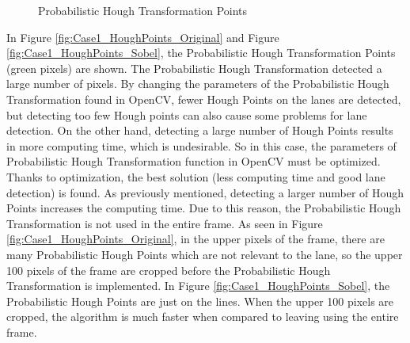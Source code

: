 \begin{figure}[H]
  \centering
  \hfill
  \caption{Probabilistic Hough Transformation Points}
\end{figure} 
 
In Figure \ref{fig:Case1_HoughPoints_Original} and Figure \ref{fig:Case1_HoughPoints_Sobel}, the Probabilistic Hough Transformation Points (green pixels) are shown. The Probabilistic Hough Transformation detected a large number of pixels. By changing the parameters of the Probabilistic Hough Transformation found in OpenCV, fewer Hough Points on the lanes are detected, but detecting too few Hough points can also cause some problems for lane detection. On the other hand, detecting a large number of Hough Points results in more computing time, which is undesirable. So in this case, the parameters of Probabilistic Hough Transformation function in OpenCV must be optimized. Thanks to optimization, the best solution (less computing time and good lane detection) is found.  As previously mentioned, detecting a larger number of Hough Points increases the computing time. Due to this reason, the Probabilistic Hough Transformation is not used in the entire frame. As seen in Figure \ref{fig:Case1_HoughPoints_Original}, in the upper pixels of the frame, there are many Probabilistic Hough Points which are not relevant to the lane, so the upper 100 pixels of the frame are cropped before the Probabilistic Hough Transformation is implemented. In Figure \ref{fig:Case1_HoughPoints_Sobel}, the Probabilistic Hough Points are just on the lines. When the upper 100 pixels are cropped, the algorithm is much faster when compared to leaving using the entire frame.

